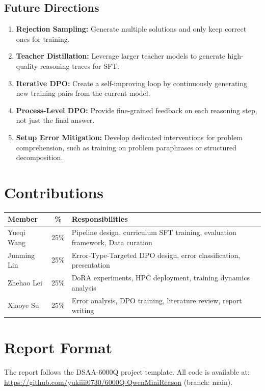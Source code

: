 \documentclass{article}
\begin{document}
\subsection{Future Directions}
\begin{enumerate}[noitemsep]
    \item \textbf{Rejection Sampling:} Generate multiple solutions and only keep correct ones for training.
    \item \textbf{Teacher Distillation:} Leverage larger teacher models to generate high-quality reasoning traces for SFT.
    \item \textbf{Iterative DPO:} Create a self-improving loop by continuously generating new training pairs from the current model.
    \item \textbf{Process-Level DPO:} Provide fine-grained feedback on each reasoning step, not just the final answer.
    \item \textbf{Setup Error Mitigation:} Develop dedicated interventions for problem comprehension, such as training on problem paraphrases or structured decomposition.
\end{enumerate}

\section{Contributions}

\begin{table}[H]
\centering
\begin{tabular}{lcp{8cm}}
\toprule
\textbf{Member} & \textbf{\%} & \textbf{Responsibilities} \\
\midrule
Yueqi Wang & 25\% & Pipeline design, curriculum SFT training, evaluation framework, Data curation \\
Junming Lin & 25\% & Error-Type-Targeted DPO design, error classification, presentation \\
Zhehao Lei & 25\% & DoRA experiments, HPC deployment, training dynamics analysis \\
Xiaoye Su & 25\% & Error analysis, DPO training, literature review, report writing\\
\bottomrule
\end{tabular}
\end{table}

\section{Report Format}
The report follows the DSAA-6000Q project template. All code is available at: \url{https://github.com/yukiiii0730/6000Q-QwenMiniReason} (branch: main).
\end{document}
